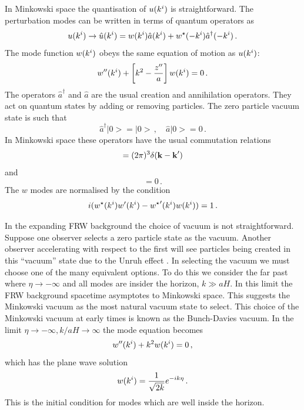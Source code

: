 In Minkowski space the quantisation of $u(k^i)$ is straightforward.
The perturbation modes can be written in terms of quantum operators as
% 
\begin{equation}
 u(k^i)\rightarrow\hat{u}(k^i) = 
  w(k^i) \hat{a}(k^i) + w^\star(-k^i)\hat{a}^\dagger(-k^i) \,.
\end{equation}
%
The mode function $w(k^i)$ obeys the same equation of motion as $u(k^i)$:
% 
\begin{equation}
\label{eq:weqn-intro}
 w''(k^i) + \left[ k^2 -\frac{z''}{a}\right]w(k^i) = 0\,.
\end{equation}
% 
The operators $\hat{a}^\dagger$ and $\hat{a}$ are the usual creation and
annihilation operators. They act on quantum states by adding or
removing particles. The zero particle vacuum state is such that
% 
\begin{equation}
 \hat{a}^\dagger|0> = |0>\,,\quad \hat{a}|0> = 0\,.
\end{equation}
% 
In Minkowski space these operators have the usual commutation relations
% 
\begin{equation}
 [\hat{a}(\kb), \hat{a}^\dagger(\kb')] = (2\pi)^3 \delta(\kb -\kb') \\
\end{equation}
and
\begin{equation}
[\hat{a}(\kb), \hat{a}(\kb')] = 0\,.
\end{equation}
% 
The $w$ modes are normalised by the condition \cite{Mukhanov:2005sc}
% 
\begin{equation}
\label{eq:quantcondition-intro}
 i(w^\star(k^i)w'(k^i) - {w^{\star}}'(k^i)w(k^i)) = 1\,.
\end{equation}


In the expanding FRW background the choice of vacuum is not straightforward.
Suppose one observer selects a zero particle state as the vacuum. Another
observer accelerating with respect to the first will see particles being
created in this ``vacuum'' state due to the Unruh effect
\cite{Kinney2009, Unruh1976a}. In selecting the vacuum we must choose one of the
many
equivalent options.
To do this we consider the far past where $\eta\rightarrow -\infty$ and all
modes
are insider the horizon, $k\gg aH$. In this limit the FRW background spacetime
asymptotes to Minkowski space. This suggests the Minkowski vacuum as the
most natural vacuum state to select. This choice of the Minkowski vacuum at
early times is known as the Bunch-Davies vacuum.
% 
In the limit $\eta\rightarrow -\infty, k/aH\rightarrow \infty$ the mode equation
 becomes
% 
\begin{equation}
  w''(k^i) + k^2 w(k^i) = 0\,,
\end{equation}
% 
which has the plane wave solution
% 
\begin{equation}
\label{eq:subhsoln-intro}
 w(k^i) = \frac{1}{\sqrt{2k}} e^{-ik\eta}\,.
\end{equation}
% 
This is the initial condition for modes which are well inside the horizon.

